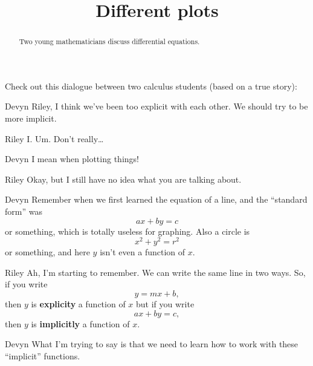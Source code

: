 \documentclass{ximera}
\title[Break-Ground:]{Different plots}
\begin{document}
\begin{abstract}
  Two young mathematicians discuss differential equations.
\end{abstract}
\maketitle








Check out this dialogue between two calculus students (based on a true
story):

\begin{dialogue}
\item[Devyn] Riley, I think we've been too explicit with each
  other. We should try to be more implicit.
\item[Riley] I. Um. Don't really\dots
\item[Devyn] I mean when plotting things!
\item[Riley] Okay, but I still have no idea what you are talking about.
\item[Devyn] Remember when we first learned the equation of a line, and the ``standard form'' was
  \[
  ax+by = c
  \]
  or something, which is totally useless for graphing. Also a circle is
  \[
  x^2 + y^2 = r^2
  \]
  or something, and here $y$ isn't even a function of
  $x$. 
\item[Riley] Ah, I'm starting to remember.  We can write the same line in two ways.  So, if you write
  \[
  y = mx + b, %
  \]
 then $y$ is {\bf explicity} a function of $x$ but if you write
    \[
  ax + by = c, %
  \]
  then $y$ is {\bf implicitly} a function of $x$.
\item[Devyn] What I'm trying to say is that we need to learn how to
  work with these ``implicit'' functions. 
\end{dialogue}
\end{document}
